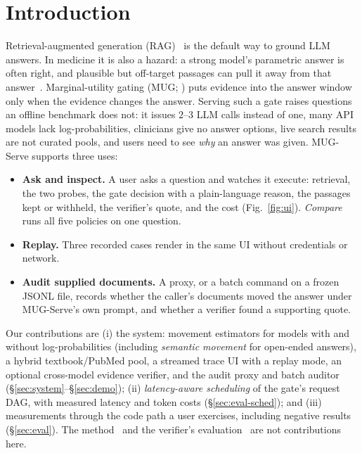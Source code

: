 \documentclass[11pt]{article}
\begin{document}
\section{Introduction}
Retrieval-augmented generation (RAG)~\citep{rag} is the default way to ground LLM
answers. In medicine it is also a hazard: a strong model's parametric answer is
often right, and plausible but off-target passages can pull it away from that
answer~\citep{distracted,knowledgeconflict,medrag}. Marginal-utility gating
(MUG; \citealp{mug}) puts evidence into the answer window only when the evidence
changes the answer. Serving such a gate raises questions an offline benchmark
does not: it issues $2$--$3$ LLM calls instead of one, many API models lack
log-probabilities, clinicians give no answer options, live search results are
not curated pools, and users need to see \emph{why} an answer was given.
MUG-Serve supports three uses:

\begin{itemize}[leftmargin=1.2em,itemsep=1pt,topsep=2pt]
\item \textbf{Ask and inspect.} A user asks a question and watches it execute:
retrieval, the two probes, the gate decision with a plain-language reason, the
passages kept or withheld, the verifier's quote, and the cost
(Fig.~\ref{fig:ui}). \emph{Compare} runs all five policies on one question.
\item \textbf{Replay.} Three recorded cases render in the same UI without
credentials or network.
\item \textbf{Audit supplied documents.} A proxy, or a batch command on a
frozen JSONL file, records whether the caller's documents moved the answer
under MUG-Serve's own prompt, and whether a verifier found a supporting quote.
\end{itemize}

\noindent Our contributions are (i) the system: movement estimators for models
with and without log-probabilities (including \emph{semantic movement} for
open-ended answers), a hybrid textbook/PubMed pool, a streamed trace UI with a
replay mode, an optional cross-model evidence verifier, and the audit proxy and
batch auditor (\S\ref{sec:system}--\S\ref{sec:demo}); (ii) \emph{latency-aware
scheduling} of the gate's request DAG, with measured latency and token costs
(\S\ref{sec:eval-sched}); and (iii) measurements through the code path a user
exercises, including negative results (\S\ref{sec:eval}). The method~\citep{mug}
and the verifier's evaluation~\citep{influence} are not contributions here.
\end{document}
